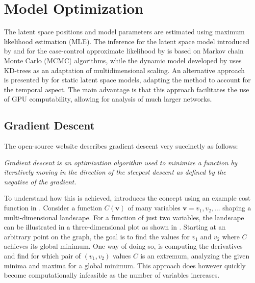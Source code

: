 \section{Model Optimization}\label{sec:model-opt}

The latent space positions and model parameters are estimated using maximum likelihood estimation (MLE). The inference for the latent space model introduced by \citeauthor*{hoff2002latent} and for the case-control approximate likelihood by \citeauthor*{raftery2012fast} is based on Markov chain Monte Carlo (MCMC) algorithms, while the dynamic model developed by \citeauthor{sarkar2005dynamic} uses KD-trees as an adaptation of multidimensional scaling. An alternative approach is presented by \citeauthor{jacobsen2018a} for static latent space models, adapting the method to account for the temporal aspect. The main advantage is that this approach facilitates the use of GPU computability, allowing for analysis of much larger networks.

\subsection{Gradient Descent}

    The open-source \href{https://ml-cheatsheet.readthedocs.io/en/latest/index.html}{\color{blue}{Machine Learning Cheatsheet}} website describes gradient descent very succinctly as follows:
    \begin{displayquote}\itshape
        Gradient descent is an optimization algorithm used to minimize a function by iteratively moving in the direction of the steepest descent as defined by the negative of the gradient. 
    \end{displayquote}
    
    To understand how this is achieved, \citeauthor{nielsen2018neural} introduces the concept using an example cost function in \cite{nielsen2018neural}.
    Consider a function $C(\bm{v})$ of many variables $\bm{v} = v_1, v_2, \dots$ shaping a multi-dimensional landscape. For a function of just two variables, the landscape can be illustrated in a three-dimensional plot as shown in . 
    Starting at an arbitrary point on the graph, the goal is to find the values for $v_1$ and $v_2$ where $C$ achieves its global minimum. One way of doing so, is computing the derivatives and find for which pair of $(v_1,v_2)$ values $C$ is an extremum, analyzing the given minima and maxima for a global minimum. This approach does however quickly become computationally infeasible as the number of variables increases. 
    
